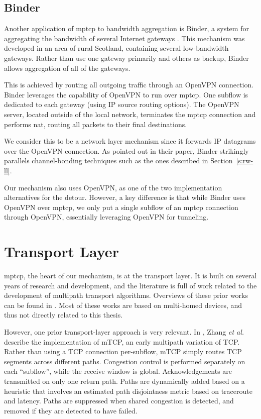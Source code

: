 \documentclass{cwru}
\begin{document}
\subsection{Binder}

Another application of \ac{mptcp} to bandwidth aggregation is Binder, a system
for aggregating the bandwidth of several Internet gateways \cite{binder}. This
mechanism was developed in an area of rural Scotland, containing several
low-bandwidth gateways. Rather than use one gateway primarily and others as
backup, Binder allows aggregation of all of the gateways.

This is achieved by routing all outgoing traffic through an OpenVPN connection.
Binder leverages the capability of OpenVPN to run over \ac{mptcp}. One subflow
is dedicated to each gateway (using IP source routing options). The OpenVPN
server, located outside of the local network, terminates the \ac{mptcp}
connection and performs \ac{nat}, routing all packets to their final
destinations.

We consider this to be a network layer mechanism since it forwards IP datagrams
over the OpenVPN connection. As pointed out in their paper, Binder strikingly
parallels channel-bonding techniques such as the ones described in
Section~\ref{s:rw-ll}.

Our mechanism also uses OpenVPN, as one of the two implementation alternatives
for the detour. However, a key difference is that while Binder uses OpenVPN over
\ac{mptcp}, we only put a single subflow of an \ac{mptcp} connection through
OpenVPN, essentially leveraging OpenVPN for tunneling.

\section{Transport Layer}
\label{s:rw-transport}

\ac{mptcp}, the heart of our mechanism, is at the transport layer. It is built
on several years of research and development, and the literature is full of work
related to the development of multipath transport algorithms. Overviews of these
prior works can be found in \cite{barre2011multipath,raiciu2012hard}. Most of
these works are based on multi-homed devices, and thus not directly related to
this thesis.

However, one prior transport-layer approach is very relevant. In
\cite{zhang2004transport}, Zhang \textit{et al.} describe the implementation of
mTCP, an early multipath variation of TCP. Rather than using a TCP connection
per-subflow, mTCP simply routes TCP segments across different paths. Congestion
control is performed separately on each ``subflow'', while the receive window is
global. Acknowledgements are transmitted on only one return path. Paths are
dynamically added based on a heuristic that involves an estimated path
disjointness metric based on traceroute and latency. Paths are suppressed when
shared congestion is detected, and removed if they are detected to have failed.
\end{document}
